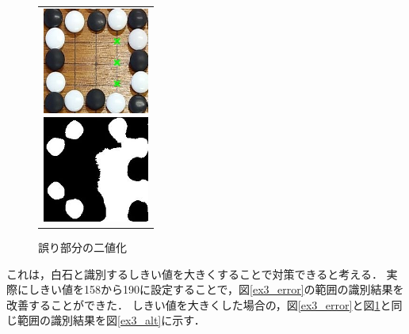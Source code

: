 \documentclass[openright]{nitocs}
\numberwithin{equation}{section}
\begin{document}
                \begin{figure}[tb] %
                    \begin{center}
                      \begin{tabular}{c}
                        \begin{minipage}{0.5\hsize}
                          \begin{center}
                            \includegraphics[clip,width=35mm]{DSC_0098/resultCompare_trim.jpg}
                        \caption{図\ref{ex3_img}の誤り部分}
                        \label{ex3_error}
                          \end{center}
                        \end{minipage}
                        \begin{minipage}{0.5\hsize}
                          \begin{center}
                            \includegraphics[clip,width=35mm]{DSC_0098/inRange_WHITE_trim.jpg}
                        \caption{誤り部分の二値化}
                        \label{ex3_error_area}
                          \end{center}
                        \end{minipage}
                      \end{tabular}
                    \end{center}
                \end{figure}
                これは，白石と識別するしきい値を大きくすることで対策できると考える．
                実際にしきい値を158から190に設定することで，図\ref{ex3_error}の範囲の識別結果を改善することができた．
                しきい値を大きくした場合の，図\ref{ex3_error}と図\ref{ex3_error_area}と同じ範囲の識別結果を図\ref{ex3_alt}に示す．
\end{document}
